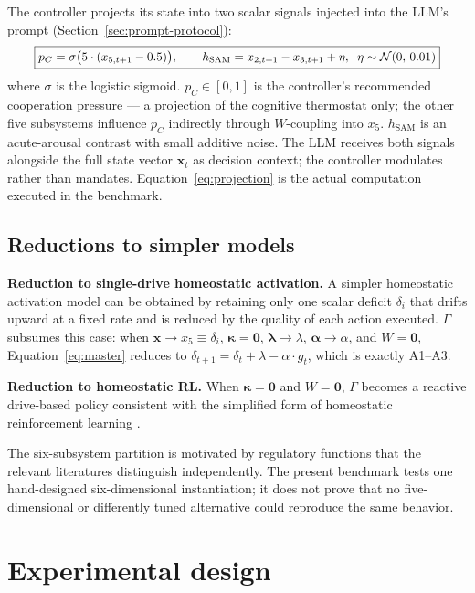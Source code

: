 \documentclass{article}
\begin{document}
The controller projects its state into two scalar signals injected into the LLM's prompt (Section~\ref{sec:prompt-protocol}):
\begin{equation}\label{eq:projection}
\resizebox{.92\columnwidth}{!}{$\boxed{p_C = \sigma\bigl(5\cdot(x_{5,t+1} - 0.5)\bigr), \qquad h_{\text{SAM}} = x_{2,t+1} - x_{3,t+1} + \eta,\;\; \eta \sim \mathcal{N}(0,\,0.01)}$}
\end{equation}
where $\sigma$ is the logistic sigmoid. $p_C \in [0,1]$ is the controller's recommended cooperation pressure --- a projection of the cognitive thermostat only; the other five subsystems influence $p_C$ indirectly through $W$-coupling into $x_5$. $h_{\text{SAM}}$ is an acute-arousal contrast with small additive noise. The LLM receives both signals alongside the full state vector $\mathbf{x}_t$ as decision context; the controller modulates rather than mandates. Equation~\eqref{eq:projection} is the actual computation executed in the benchmark.

\subsection{Reductions to simpler models}

\textbf{Reduction to single-drive homeostatic activation.} A simpler homeostatic activation model can be obtained by retaining only one scalar deficit $\delta_i$ that drifts upward at a fixed rate and is reduced by the quality of each action executed. $\Gamma$ subsumes this case: when $\mathbf{x} \to x_5 \equiv \delta_i$, $\boldsymbol{\kappa}=\mathbf{0}$, $\boldsymbol{\lambda} \to \lambda$, $\boldsymbol{\alpha} \to \alpha$, and $W=\mathbf{0}$, Equation~\eqref{eq:master} reduces to $\delta_{t+1} = \delta_t + \lambda - \alpha \cdot g_t$, which is exactly A1--A3.

\textbf{Reduction to homeostatic RL.} When $\boldsymbol{\kappa}=\mathbf{0}$ and $W=\mathbf{0}$, $\Gamma$ becomes a reactive drive-based policy consistent with the simplified form of homeostatic reinforcement learning \citep{keramati2014homeostatic}.

The six-subsystem partition is motivated by regulatory functions that the relevant literatures distinguish independently. The present benchmark tests one hand-designed six-dimensional instantiation; it does not prove that no five-dimensional or differently tuned alternative could reproduce the same behavior.

\section{Experimental design}
\end{document}
